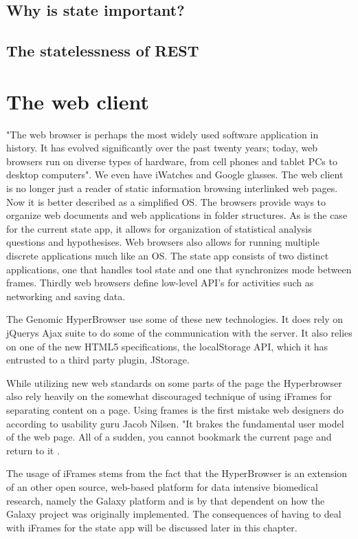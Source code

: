 \documentclass[english]{ifimaster}
\begin{document}
\subsection{Why is state important?}

\subsection{The statelessness of REST}

\section{The web client}
"The web browser is perhaps the most widely used software application in history. It has evolved significantly over the past twenty years; today, web browsers run on diverse types of hardware, from cell phones and tablet PCs to desktop computers"\parencite[p. 2]{gross}. We even have iWatches and Google glasses. The web client is no longer just a reader of static information browsing interlinked web pages. Now it is better described as a simplified OS\parencite[p.310]{flanagan}. The browsers provide ways to organize web documents and web applications in folder structures. As is the case for the current state app, it allows for organization of statistical analysis questions and hypothesises. Web browsers also allows for running multiple discrete applications much like an OS. The state app consists of two distinct applications, one that handles tool state and one that synchronizes mode between frames. Thirdly web browsers define low-level API's for activities such as networking and saving data. 

The Genomic HyperBrowser use some of these new technologies. It does rely on jQuerys Ajax suite to do some of the communication with the server. It also relies on one of the new HTML5 specifications, the localStorage API, which it has entrusted to a third party plugin, JStorage. 

While utilizing new web standards on some parts of the page the Hyperbrowser also rely heavily on the somewhat discouraged technique of using iFrames for separating content on a page. Using frames is the first mistake web designers do according to usability guru Jacob Nilsen. "It brakes the fundamental user model of the web page. All of a sudden, you cannot bookmark the current page and return to it \parencite{nielsen1997user}.

The usage of iFrames stems from the fact that the HyperBrowser is an extension of an other open source, web-based platform for data intensive biomedical research, namely the Galaxy platform and is by that dependent on how the Galaxy project was originally implemented. The consequences of having to deal with iFrames for the state app will be discussed later in this chapter.
\end{document}
